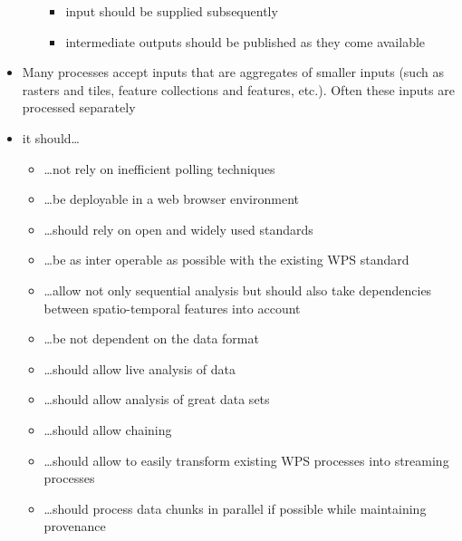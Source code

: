 \begin{itemize}
\begin{itemize}
			\begin{itemize}
				\item input should be supplied subsequently
				\item intermediate outputs should be published as they come available
			\end{itemize}
		\end{itemize}
		\item Many processes accept inputs that are aggregates of smaller inputs (such as rasters and tiles, feature collections and features, etc.). Often these inputs are processed separately
		\item it should\dots
		\begin{itemize}
			\item \dots not rely on inefficient polling techniques
			\item \dots be deployable in a web browser environment
			\item \dots should rely on open and widely used standards
			\item \dots be as inter operable as possible with the existing WPS standard
			\item \dots allow not only sequential analysis but should also take dependencies between spatio-temporal features into account
			\item \dots be not dependent on the data format
			\item \dots should allow live analysis of data
			\item \dots should allow analysis of great data sets
			\item \dots should allow chaining
			\item \dots should allow to easily transform existing WPS processes into streaming processes
			\item \dots should process data chunks in parallel if possible while maintaining provenance
		\end{itemize}


\end{itemize}
